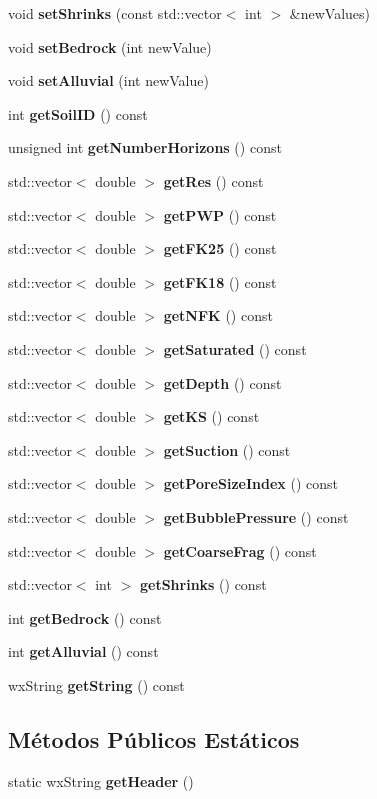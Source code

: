 \begin{DoxyCompactItemize}
void {\bf set\+Shrinks} (const std\+::vector$<$ int $>$ \&new\+Values)
\item 
void {\bf set\+Bedrock} (int new\+Value)
\item 
void {\bf set\+Alluvial} (int new\+Value)
\item 
int {\bf get\+Soil\+ID} () const 
\item 
unsigned int {\bf get\+Number\+Horizons} () const 
\item 
std\+::vector$<$ double $>$ {\bf get\+Res} () const 
\item 
std\+::vector$<$ double $>$ {\bf get\+P\+WP} () const 
\item 
std\+::vector$<$ double $>$ {\bf get\+F\+K25} () const 
\item 
std\+::vector$<$ double $>$ {\bf get\+F\+K18} () const 
\item 
std\+::vector$<$ double $>$ {\bf get\+N\+FK} () const 
\item 
std\+::vector$<$ double $>$ {\bf get\+Saturated} () const 
\item 
std\+::vector$<$ double $>$ {\bf get\+Depth} () const 
\item 
std\+::vector$<$ double $>$ {\bf get\+KS} () const 
\item 
std\+::vector$<$ double $>$ {\bf get\+Suction} () const 
\item 
std\+::vector$<$ double $>$ {\bf get\+Pore\+Size\+Index} () const 
\item 
std\+::vector$<$ double $>$ {\bf get\+Bubble\+Pressure} () const 
\item 
std\+::vector$<$ double $>$ {\bf get\+Coarse\+Frag} () const 
\item 
std\+::vector$<$ int $>$ {\bf get\+Shrinks} () const 
\item 
int {\bf get\+Bedrock} () const 
\item 
int {\bf get\+Alluvial} () const 
\item 
wx\+String {\bf get\+String} () const 
\end{DoxyCompactItemize}
\subsection*{Métodos Públicos Estáticos}
\begin{DoxyCompactItemize}
\item 
static wx\+String {\bf get\+Header} ()
\end{DoxyCompactItemize}
